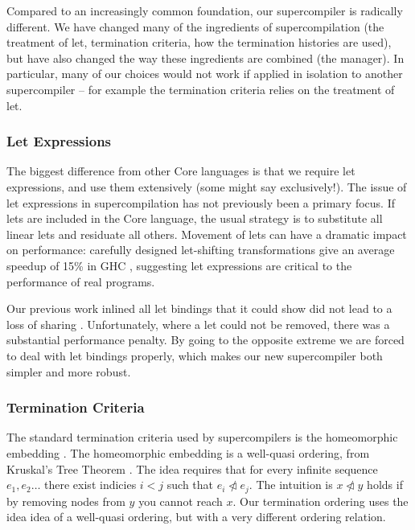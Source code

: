 \documentclass[draft]{sigplanconf}
\begin{document}
Compared to an increasingly common foundation, our supercompiler is radically different. We have changed many of the ingredients of supercompilation (the treatment of let, termination criteria, how the termination histories are used), but have also changed the way these ingredients are combined (the manager). In particular, many of our choices would not work if applied in isolation to another supercompiler -- for example the termination criteria relies on the treatment of let.

\subsubsection{Let Expressions}

The biggest difference from other Core languages is that we require let expressions, and use them extensively (some might say exclusively!). The issue of let expressions in supercompilation has not previously been a primary focus. If lets are included in the Core language, the usual strategy is to substitute all linear lets and residuate all others. Movement of lets can have a dramatic impact on performance: carefully designed let-shifting transformations give an average speedup of 15\% in GHC \cite{spj:letfloating}, suggesting let expressions are critical to the performance of real programs.

Our previous work inlined all let bindings that it could show did not lead to a loss of sharing \cite{me:supero}. Unfortunately, where a let could not be removed, there was a substantial performance penalty. By going to the opposite extreme we are forced to deal with let bindings properly, which makes our new supercompiler both simpler and more robust.

\subsubsection{Termination Criteria}

The standard termination criteria used by supercompilers is the homeomorphic embedding \cite{leuschel:homeomorphic}. The homeomorphic embedding is a well-quasi ordering, from Kruskal's Tree Theorem \cite{kruskal:tree}. The idea requires that for every infinite sequence $e_1,e_2 \ldots$ there exist indicies $i < j$ such that $e_i \ntriangleleft e_j$. The intuition is $x \ntriangleleft y$ holds if by removing nodes from $y$ you cannot reach $x$. Our termination ordering uses the idea idea of a well-quasi ordering, but with a very different ordering relation.
\end{document}
